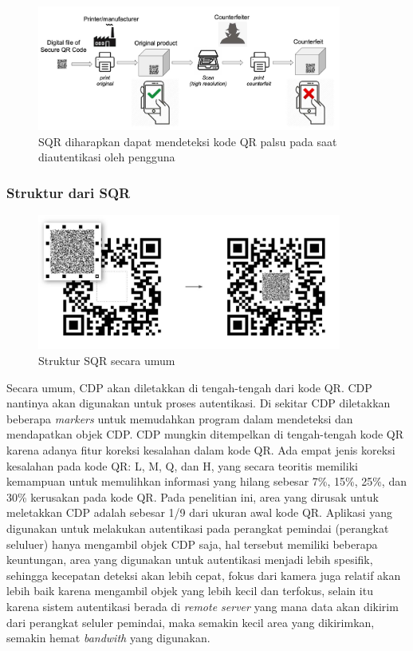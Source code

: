 \begin{figure}[h]
	\centering
	\includegraphics[width=10cm]{contents/chapter-2/2-counterveiterpractice.jpg}
	\caption{SQR diharapkan dapat mendeteksi kode QR palsu pada saat diautentikasi oleh pengguna \cite{picard2021counterfeit}}
	\label{Fig: 2-counterveiterpractice}
\end{figure}

\subsubsection{Struktur dari SQR}
\begin{figure}[h]
	\centering
	\includegraphics[width=10cm]{contents/chapter-2/2-struktursqr.jpg}
	\caption{Struktur SQR secara umum \cite{picard2021counterfeit}}
	\label{Fig: 2-struktursqr}
\end{figure}

Secara umum, CDP akan diletakkan di tengah-tengah dari kode QR. CDP nantinya akan digunakan untuk proses autentikasi. Di sekitar CDP diletakkan beberapa \emph{markers} untuk memudahkan program dalam mendeteksi dan mendapatkan objek CDP. CDP mungkin ditempelkan di tengah-tengah kode QR karena adanya fitur koreksi kesalahan dalam kode QR. Ada empat jenis koreksi kesalahan pada kode QR: L, M, Q, dan H, yang secara teoritis memiliki kemampuan untuk memulihkan informasi yang hilang sebesar 7\%, 15\%, 25\%, dan 30\% kerusakan pada kode QR. Pada penelitian ini, area yang dirusak untuk meletakkan CDP adalah sebesar 1/9 dari ukuran awal kode QR. Aplikasi yang digunakan untuk melakukan autentikasi pada perangkat pemindai (perangkat seluluer) hanya mengambil objek CDP saja, hal tersebut memiliki beberapa keuntungan, area yang digunakan untuk autentikasi menjadi lebih spesifik, sehingga kecepatan deteksi akan lebih cepat, fokus dari kamera juga relatif akan lebih baik karena mengambil objek yang lebih kecil dan terfokus, selain itu karena sistem autentikasi berada di \emph{remote server} yang mana data akan dikirim dari perangkat seluler pemindai, maka semakin kecil area yang dikirimkan, semakin hemat \emph{bandwith} yang digunakan.

